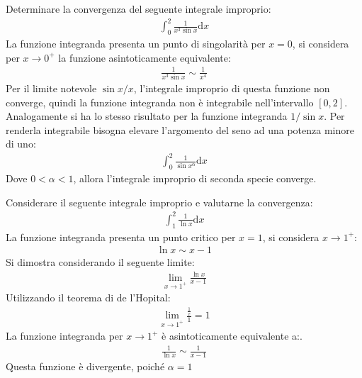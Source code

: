 \documentclass{article}
\numberwithin{equation}{subsection}
\begin{document}
Determinare la convergenza del seguente integrale improprio:
\begin{gather*}
    \displaystyle\int_0^2\frac{1}{x^3\sin x}\mathrm{d}x
\end{gather*}
La funzione integranda presenta un punto di singolarità per $x=0$, si considera per $x\to0^+$ la funzione asintoticamente equivalente:
\begin{gather*}
    \displaystyle\frac{1}{x^3\sin x}\sim\frac{1}{x^4}
\end{gather*}
Per il limite notevole $\sin x/x$, l'integrale improprio di questa funzione non converge, quindi la funzione integranda non è integrabile nell'intervallo $[0,2]$. 
Analogamente si ha lo stesso risultato per la funzione integranda $1/\sin x$. Per renderla integrabile bisogna elevare l'argomento del seno ad una potenza minore di uno:
\begin{gather*}
    \displaystyle\int_0^2\frac{1}{\sin x^\alpha}\mathrm{d}x
\end{gather*}
Dove $0<\alpha<1$, allora l'integrale improprio di seconda specie converge. 



Considerare il seguente integrale improprio e valutarne la convergenza:
\begin{gather*}
    \displaystyle\int_1^2\frac{1}{\ln x}\mathrm{d}x
\end{gather*}
La funzione integranda presenta un punto critico per $x=1$, si considera $x\to1^+$:
\begin{gather*}
    \ln x\sim x-1
\end{gather*}
Si dimostra considerando il seguente limite:
\begin{gather*}
    \lim_{x\to1^+}\frac{\ln x}{x-1}
\end{gather*}
Utilizzando il teorema di de l'Hopital:
\begin{gather*}
    \lim_{x\to1^+}\frac{\frac{1}{x}}{1}=1
\end{gather*}
La funzione integranda per $x\to1^+$ è asintoticamente equivalente a:. 
\begin{gather*}
    \displaystyle\frac{1}{\ln x}\sim\frac{1}{x-1}
\end{gather*}
Questa funzione è divergente, poiché $\alpha=1$
\end{document}
